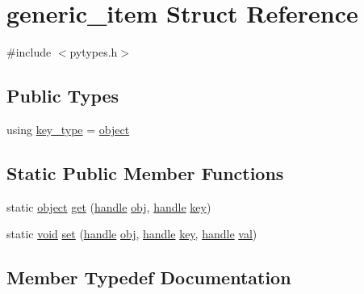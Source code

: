 \hypertarget{structgeneric__item}{}\section{generic\+\_\+item Struct Reference}
\label{structgeneric__item}


{\ttfamily \#include $<$pytypes.\+h$>$}

\subsection*{Public Types}
\begin{DoxyCompactItemize}
\item 
using \mbox{\hyperlink{structgeneric__item_a68f3b78a1197a0102dde5e5e3d5a469b}{key\+\_\+type}} = \mbox{\hyperlink{classobject}{object}}
\end{DoxyCompactItemize}
\subsection*{Static Public Member Functions}
\begin{DoxyCompactItemize}
\item 
static \mbox{\hyperlink{classobject}{object}} \mbox{\hyperlink{structgeneric__item_a5891008ff5364e7f6d8d8caab9c94d48}{get}} (\mbox{\hyperlink{classhandle}{handle}} \mbox{\hyperlink{_s_d_l__opengl__glext_8h_a0c0d4701a6c89f4f7f0640715d27ab26}{obj}}, \mbox{\hyperlink{classhandle}{handle}} \mbox{\hyperlink{setobject_8h_ab06f52e01abcbec81a27c56570d3c10b}{key}})
\item 
static \mbox{\hyperlink{_s_d_l__opengles2__gl2ext_8h_ae5d8fa23ad07c48bb609509eae494c95}{void}} \mbox{\hyperlink{structgeneric__item_a83223e508d3929a33c1c304bc60b6374}{set}} (\mbox{\hyperlink{classhandle}{handle}} \mbox{\hyperlink{_s_d_l__opengl__glext_8h_a0c0d4701a6c89f4f7f0640715d27ab26}{obj}}, \mbox{\hyperlink{classhandle}{handle}} \mbox{\hyperlink{setobject_8h_ab06f52e01abcbec81a27c56570d3c10b}{key}}, \mbox{\hyperlink{classhandle}{handle}} \mbox{\hyperlink{_s_d_l__opengl__glext_8h_a26942fd2ed566ef553eae82d2c109c8f}{val}})
\end{DoxyCompactItemize}


\subsection{Member Typedef Documentation}
\mbox{\label{structgeneric__item_a68f3b78a1197a0102dde5e5e3d5a469b}} 
